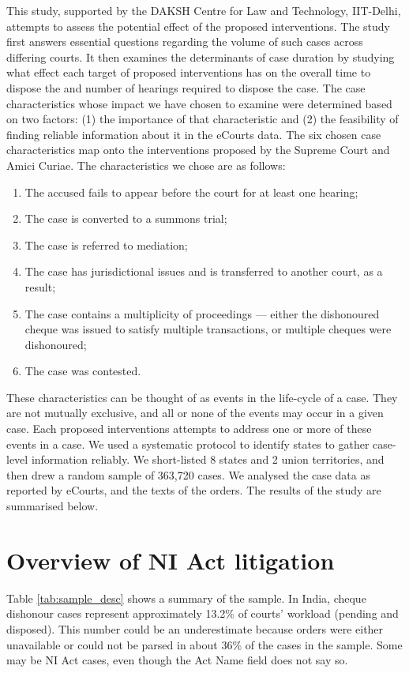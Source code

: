 \documentclass[11pt,a4paper]{article}
\begin{document}
This study, supported by the DAKSH Centre for Law and Technology, IIT-Delhi, attempts to assess the potential effect of the proposed interventions. The study first answers essential questions regarding the volume of such cases across differing courts. It then examines the determinants of case duration by studying what effect each target of proposed interventions has on the overall time to dispose the and number of hearings required to dispose the case. The case characteristics whose impact we have chosen to examine were determined based on two factors: (1) the importance of that characteristic and (2) the feasibility of finding reliable information about it in the eCourts data. The six chosen case characteristics map onto the interventions proposed by the Supreme Court and Amici Curiae. The characteristics we chose are as follows:
\begin{enumerate}
\item The accused fails to appear before the court for at least one hearing;
\item The case is converted to a summons trial;
\item The case is referred to mediation;
\item The case has jurisdictional issues and is transferred to another court, as a result;
\item The case contains a multiplicity of proceedings --- either the dishonoured cheque was issued to satisfy multiple transactions, or multiple cheques were dishonoured;
\item The case was contested.
\end{enumerate}

These characteristics can be thought of as events in the life-cycle of a case. They are not mutually exclusive, and all or none of the events may occur in a given case. Each proposed interventions attempts to address one or more of these events in a case. We used a systematic protocol to identify states to gather case-level information reliably. We short-listed 8 states and 2 union territories, and then drew a random sample of 363,720 cases. We analysed the case data as reported by eCourts, and the texts of the orders. The results of the study are summarised below.

\section{Overview of NI Act litigation}
\label{sec:findings}

Table \ref{tab:sample_desc} shows a summary of the sample. In India, cheque dishonour cases represent approximately 13.2\% of courts' workload (pending and disposed). This number could be an underestimate because orders were either unavailable or could not be parsed in about 36\% of the cases in the sample. Some may be NI Act cases, even though the Act Name field does not say so.
\end{document}
